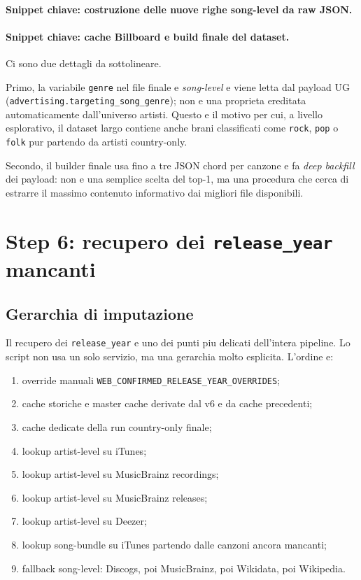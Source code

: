 \documentclass[11pt]{article}
\begin{document}
\paragraph{Snippet chiave: costruzione delle nuove righe song-level da raw JSON.}


\paragraph{Snippet chiave: cache Billboard e build finale del dataset.}


Ci sono due dettagli da sottolineare.

Primo, la variabile \texttt{genre} nel file finale e \emph{song-level} e viene letta dal payload UG (\texttt{advertising.targeting\_song\_genre}); non e una proprieta ereditata automaticamente dall'universo artisti. Questo e il motivo per cui, a livello esplorativo, il dataset largo contiene anche brani classificati come \texttt{rock}, \texttt{pop} o \texttt{folk} pur partendo da artisti country-only.

Secondo, il builder finale usa fino a tre JSON chord per canzone e fa \emph{deep backfill} dei payload: non e una semplice scelta del top-1, ma una procedura che cerca di estrarre il massimo contenuto informativo dai migliori file disponibili.

\section{Step 6: recupero dei \texttt{release\_year} mancanti}
\subsection{Gerarchia di imputazione}
Il recupero dei \texttt{release\_year} e uno dei punti piu delicati dell'intera pipeline. Lo script non usa un solo servizio, ma una gerarchia molto esplicita. L'ordine e:
\begin{enumerate}[leftmargin=2em]
\item override manuali \texttt{WEB\_CONFIRMED\_RELEASE\_YEAR\_OVERRIDES};
\item cache storiche e master cache derivate dal v6 e da cache precedenti;
\item cache dedicate della run country-only finale;
\item lookup artist-level su iTunes;
\item lookup artist-level su MusicBrainz recordings;
\item lookup artist-level su MusicBrainz releases;
\item lookup artist-level su Deezer;
\item lookup song-bundle su iTunes partendo dalle canzoni ancora mancanti;
\item fallback song-level: Discogs, poi MusicBrainz, poi Wikidata, poi Wikipedia.
\end{enumerate}
\end{document}
